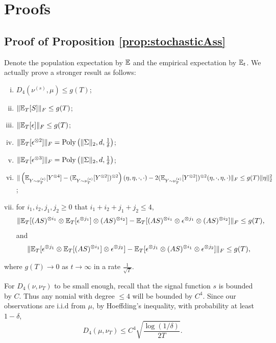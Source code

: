 \onecolumn
\appendix

\section{Proofs}
\label{sec:Appendix}
\subsection{Proof of Proposition \ref{prop:stochasticAss}}
Denote the population expectation by $\mathbb{E}$ and the empirical expectation by $\mathbb{E}_t$. We actually prove a stronger result as follows:
\begin{enumerate}[(i).]
\item $D_4(\nu^{(s)}, \mu)\le g(T)$;
\item $\| \mathbb{E}_T[S] \|_F \le g(T)$;
\item $\| \mathbb{E}_T[\epsilon] \|_F \le g(T)$; 
\item $\| \mathbb{E}_T[\epsilon^{\otimes 2}] \|_F  = \operatorname{Poly}\left(\|\Sigma\|_2,d,\frac{1}{\delta}\right)$;
\item $\| \mathbb{E}_T[\epsilon^{\otimes 3}] \|_F  = \operatorname{Poly}\left(\|\Sigma\|_2,d,\frac{1}{\delta}\right)$;
\item $\| \left(\mathbb{E}_{Y\sim \nu_T^{(\epsilon)}} [Y^{\otimes4}] - (\mathbb{E}_{Y\sim \nu_T^{(\epsilon)}} [Y^{\otimes2}])^{\otimes 2}\right)(\eta,\eta,\cdot,\cdot)  - 2 (\mathbb{E}_{Y\sim \nu_T^{(\epsilon)}} [Y^{\otimes2}])^{\otimes 2}(\eta,\cdot,\eta,\cdot)\|_F\le  g(T) \|\eta\|_2^2$;
\item for $i_1,i_2,j_1,j_2 \ge 0$ that $i_1+i_2+j_1+j_2 \le 4$,  
\begin{align*}
\| \mathbb{E}_T[(AS)^{\otimes i_1} \otimes \mathbb{E}_T[\epsilon^{\otimes j_1}] \otimes (AS)^{\otimes i_2}] - \mathbb{E}_T[(AS)^{\otimes i_1}\otimes \epsilon^{\otimes j_1}\otimes (AS)^{\otimes i_2}]  \|_F \le  g(T),
\end{align*}
and 
\begin{align*}
\| \mathbb{E}_T[\epsilon^{\otimes j_1} \otimes \mathbb{E}_T[(AS)^{\otimes i_1}] \otimes \epsilon^{\otimes j_2}] - \mathbb{E}_T[ \epsilon^{\otimes j_1}\otimes (AS)^{\otimes i_1}\otimes \epsilon^{\otimes j_2}]  \|_F \le  g(T),
\end{align*}
\end{enumerate}
where $g(T)\rightarrow 0$ as $t\rightarrow \infty$ in a rate $\frac{1}{\sqrt{T}}$. 

For $D_4(\nu, \nu_T)$ to be small enough, recall that the signal function $s$ is bounded by $C$. 
Thus any nomial with degree $\le 4$ will be bounded by $C^4$. Since our observations are i.i.d from $\mu$, by Hoeffding's inequality, with probability at least $1-\delta$, 
\[
D_4(\mu, \nu_T) \le  C^4\sqrt{\frac{\log(1/\delta)}{2T}}.
\]

